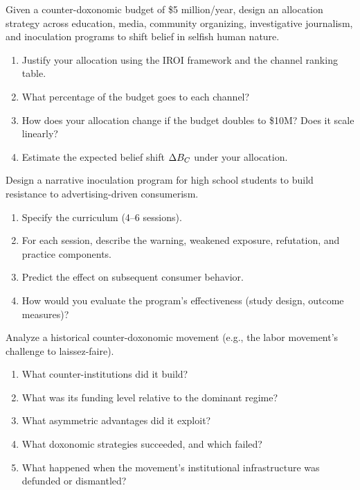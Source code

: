 \begin{exercise}
Given a counter-doxonomic budget of \$5 million/year, design an allocation strategy across education, media, community organizing, investigative journalism, and inoculation programs to shift belief in selfish human nature.
\begin{enumerate}[nosep]
  \item Justify your allocation using the IROI framework and the channel ranking table.
  \item What percentage of the budget goes to each channel?
  \item How does your allocation change if the budget doubles to \$10M? Does it scale linearly?
  \item Estimate the expected belief shift $\Delta B_{C}$ under your allocation.
\end{enumerate}
\end{exercise}

\begin{exercise}
Design a narrative inoculation program for high school students to build resistance to advertising-driven consumerism.
\begin{enumerate}[nosep]
  \item Specify the curriculum (4--6 sessions).
  \item For each session, describe the warning, weakened exposure, refutation, and practice components.
  \item Predict the effect on subsequent consumer behavior.
  \item How would you evaluate the program's effectiveness (study design, outcome measures)?
\end{enumerate}
\end{exercise}

\begin{exercise}
Analyze a historical counter-doxonomic movement (e.g., the labor movement's challenge to laissez-faire).
\begin{enumerate}[nosep]
  \item What counter-institutions did it build?
  \item What was its funding level relative to the dominant regime?
  \item What asymmetric advantages did it exploit?
  \item What doxonomic strategies succeeded, and which failed?
  \item What happened when the movement's institutional infrastructure was defunded or dismantled?
\end{enumerate}
\end{exercise}

